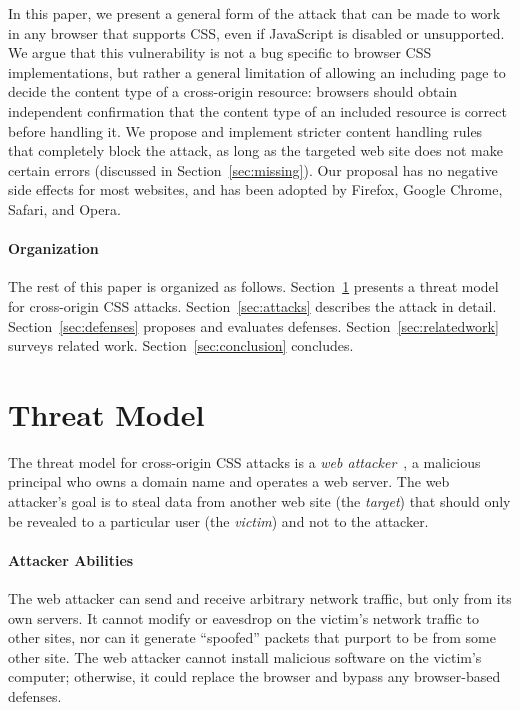 \documentclass{sig-alternate}
\begin{document}
In this paper, we present a general form of the attack that can be
made to work in any browser that supports CSS, even if JavaScript is
disabled or unsupported. We argue that this vulnerability is not a bug
specific to browser CSS implementations, but rather a general limitation of
allowing an including page to decide the content type of a cross-origin resource:
browsers should obtain independent confirmation that the
content type of an included resource is correct before handling it.
We propose and implement stricter content handling rules that
completely block the attack, as long as the targeted web site does not
make certain errors (discussed in Section~\ref{sec:missing}). Our
proposal has no negative side effects for most websites, and has been
adopted by Firefox, Google Chrome, Safari, and Opera.

\paragraph{Organization}
The rest of this paper is organized as
follows. Section~\ref{sec:threatmodel} presents a threat model for
cross-origin CSS attacks.  Section~\ref{sec:attacks} describes the
attack in detail. Section~\ref{sec:defenses} proposes and evaluates
defenses.  Section~\ref{sec:relatedwork} surveys related work.
Section~\ref{sec:conclusion} concludes.

\section{Threat Model} \label{sec:threatmodel}

The threat model for cross-origin CSS attacks is a \emph{web
attacker}~\cite{jackson09thesis}, a malicious principal who
owns a domain name and operates a web server. The web attacker's
goal is to steal data from another web site (the \emph{target})
that should only be revealed to a particular user (the
\emph{victim}) and not to the attacker.

\paragraph{Attacker Abilities}
The web attacker can send and receive arbitrary network traffic, but
only from its own servers. It cannot modify or eavesdrop on the
victim's network traffic to other sites, nor can it generate “spoofed”
packets that purport to be from some other site. The web attacker
cannot install malicious software on the victim's computer; otherwise,
it could replace the browser and bypass any browser-based defenses.
\end{document}
